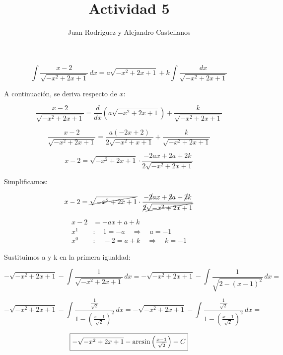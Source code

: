 \documentclass{article}
\begin{document}
	
	\title{Actividad 5}
	\author{Juan Rodriguez y Alejandro Castellanos}
	\date{}
	{\Large {}}
	
	\[
	\int \frac{x-2}{\sqrt{-x^2+2x+1}} \,dx  = a \sqrt{-x^2 + 2x + 1} + k \int \frac{dx}{\sqrt{-x^2 + 2x + 1}}
	\]
	
	\vspace{12pt}
	
	A continuación, se deriva respecto de \( x \):
	
	\[
	\frac{x-2}{\sqrt{-x^2 +2x+1}} = \frac{d}{dx}\left(a\sqrt{-x^2 +2x+1}\right) + \frac{k}{\sqrt{-x^2 +2x+1}}
	\]
	
	\[
	\frac{x-2}{\sqrt{-x^2 +2x+1}} = \frac{a(-2x+2)}{2\sqrt{-x^2+x+1}} + \frac{k}{\sqrt{-x^2 +2x+1}}
	\]
	
	\[
	x-2 = \sqrt{-x^2 +2x+1} \cdot \frac{-2ax+2a+2k}{2\sqrt{-x^2 +2x+1}}
	\]
	
	Simplificamos:
	
	\[
	x-2 = \cancel{\sqrt{-x^2 +2x+1}} \cdot \frac{{-\cancel2ax+\cancel2a+\cancel2k}}{\cancel{2}\cancel{\sqrt{-x^2 +2x+1}}}
	\]
	
	\begin{align*}
		x-2 &= -ax + a + k \\
		x^1 &:\quad 1 = -a \quad \Rightarrow \quad a = -1 \\
		x^0 &:\quad -2 = a + k \quad \Rightarrow \quad k = -1
	\end{align*}
	
	Sustituimos a y k en la primera igualdad:
	
	\[
	-\sqrt{-x^2 + 2x + 1} - \int \frac{1}{\sqrt{-x^2 + 2x + 1}} \,dx = -\sqrt{-x^2 + 2x + 1} - \int \frac{1}{\sqrt{2 - (x-1)^2}} \,dx =
	\]
	
	\[
	-\sqrt{-x^2 + 2x + 1} - \int \frac{\frac{1}{\sqrt{2}}}{1 - \left(\frac{x-1}{\sqrt{2}}\right)^2}\,dx = -\sqrt{-x^2 + 2x + 1} - \int  \frac{\frac{1}{\sqrt{2}}}{1 - \left(\frac{x-1}{\sqrt{2}}\right)^2} \,dx =
	\]	
	
	\[
	\fbox{$-\sqrt{-x^2 + 2x + 1} - \arcsin\left(\frac{x-1}{\sqrt{2}}\right) + C$}
	\]
	
	\section*{}
	{\Large {}}
	
\end{document}
